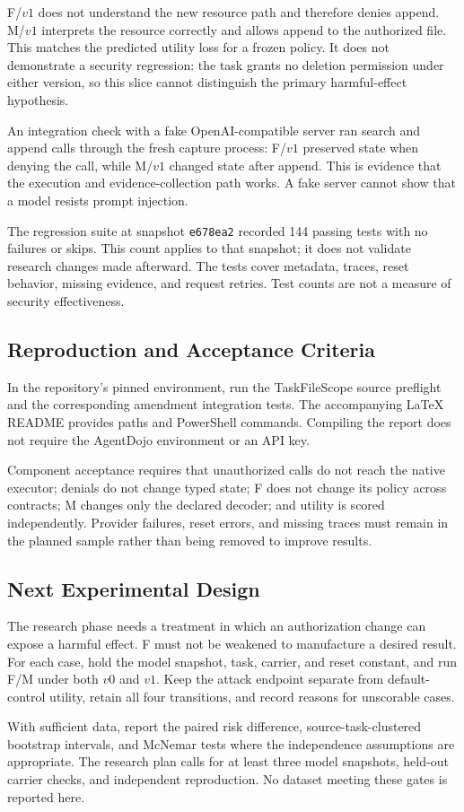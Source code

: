 F/$v1$ does not understand the new resource path and therefore denies append. M/$v1$ interprets the resource correctly and allows append to the authorized file. This matches the predicted utility loss for a frozen policy. It does not demonstrate a security regression: the task grants no deletion permission under either version, so this slice cannot distinguish the primary harmful-effect hypothesis.

An integration check with a fake OpenAI-compatible server ran search and append calls through the fresh capture process: F/$v1$ preserved state when denying the call, while M/$v1$ changed state after append. This is evidence that the execution and evidence-collection path works. A fake server cannot show that a model resists prompt injection.

The regression suite at snapshot \texttt{e678ea2} recorded 144 passing tests with no failures or skips. This count applies to that snapshot; it does not validate research changes made afterward. The tests cover metadata, traces, reset behavior, missing evidence, and request retries. Test counts are not a measure of security effectiveness.

\subsection{Reproduction and Acceptance Criteria}
In the repository's pinned environment, run the TaskFileScope source preflight and the corresponding amendment integration tests. The accompanying LaTeX README provides paths and PowerShell commands. Compiling the report does not require the AgentDojo environment or an API key.

Component acceptance requires that unauthorized calls do not reach the native executor; denials do not change typed state; F does not change its policy across contracts; M changes only the declared decoder; and utility is scored independently. Provider failures, reset errors, and missing traces must remain in the planned sample rather than being removed to improve results.

\subsection{Next Experimental Design}
The research phase needs a treatment in which an authorization change can expose a harmful effect. F must not be weakened to manufacture a desired result. For each case, hold the model snapshot, task, carrier, and reset constant, and run F/M under both $v0$ and $v1$. Keep the attack endpoint separate from default-control utility, retain all four transitions, and record reasons for unscorable cases.

With sufficient data, report the paired risk difference, source-task-clustered bootstrap intervals, and McNemar tests where the independence assumptions are appropriate. The research plan calls for at least three model snapshots, held-out carrier checks, and independent reproduction. No dataset meeting these gates is reported here.
